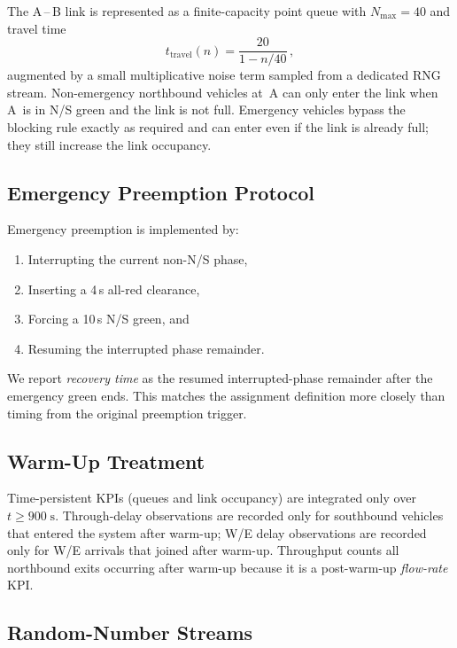 \documentclass[11pt,a4paper]{article}
\begin{document}
The A\,--\,B link is represented as a finite-capacity point queue with $N_{\max}=40$ and travel time
\[
  t_{\text{travel}}(n) = \frac{20}{1 - n/40}\,,
\]
augmented by a small multiplicative noise term sampled from a dedicated RNG stream. Non-emergency northbound vehicles at~A can only enter the link when A~is in N/S green and the link is not full. Emergency vehicles bypass the blocking rule exactly as required and can enter even if the link is already full; they still increase the link occupancy.

\subsection{Emergency Preemption Protocol}

Emergency preemption is implemented by:
\begin{enumerate}[leftmargin=1.2em,itemsep=2pt]
  \item Interrupting the current non-N/S phase,
  \item Inserting a 4\,s all-red clearance,
  \item Forcing a 10\,s N/S green, and
  \item Resuming the interrupted phase remainder.
\end{enumerate}
We report \emph{recovery time} as the resumed interrupted-phase remainder after the emergency green ends. This matches the assignment definition more closely than timing from the original preemption trigger.

\subsection{Warm-Up Treatment}

\begin{cautionbox}
Time-persistent KPIs (queues and link occupancy) are integrated only over $t \ge 900\;\text{s}$. Through-delay observations are recorded only for southbound vehicles that entered the system after warm-up; W/E delay observations are recorded only for W/E arrivals that joined after warm-up. Throughput counts all northbound exits occurring after warm-up because it is a post-warm-up \emph{flow-rate} KPI.
\end{cautionbox}

\subsection{Random-Number Streams}
\end{document}

